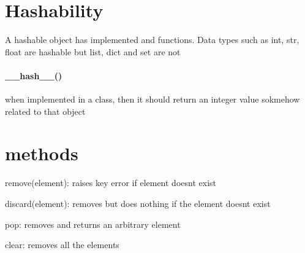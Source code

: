 \section{Hashability}
    A hashable object has implemented  and  functions. Data types such as int, str, float are hashable but list, dict and set are not
    \paragraph{\_\_hash\_\_()}
        when implemented in a class, then it should return an  integer value sokmehow related to that object

\section{methods}
    
    remove(element): raises key error if element doesnt exist
    
    discard(element): removes but does nothing if the element doesnt exist
    
    pop: removes and returns an arbitrary element
    
    clear: removes all the elements


    